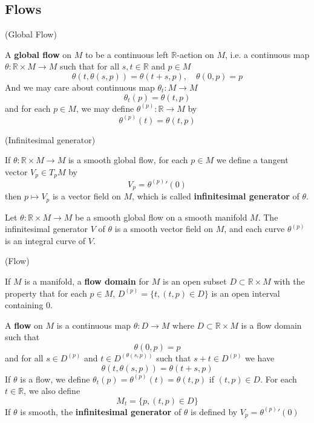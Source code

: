 \subsection{Flows}

\begin{definition}(Global Flow)\par
    A \textbf{global flow} on $M$ to be a continuous left $\mathbb{R}$-action on $M$, i.e. a continuous map $\theta:\mathbb{R}\times M \to M$ such that for all $s,t\in\mathbb{R}$ and $p\in M$
    \[\theta(t,\theta(s,p)) = \theta(t+s,p),\quad \theta(0,p) = p\]
    And we may care about continuous map $\theta_t:M\to M$
    \[\theta_t(p) = \theta(t,p)\]
    and for each $p\in M$, we may define $\theta^{(p)}:\mathbb{R} \to M$
    by 
    \[\theta^{(p)}(t) = \theta(t,p)\]
\end{definition}


\begin{definition}(Infinitesimal generator)\par
    If $\theta:\mathbb{R}\times M \to M$ is a smooth global flow, for each $p\in M$ we define a tangent vector $V_p\in T_pM$ by
    \[V_p = {\theta^{(p)}}'(0)\]
    then $p\mapsto V_p$ is a vector field on $M$, which is called \textbf{infinitesimal generator} of $\theta$.     
\end{definition}

\begin{proposition}
    Let $\theta:\mathbb{R} \times M \to M$ be a smooth global flow on a smooth manifold $M$. The infinitesimal generator $V$ of $\theta$ is a smooth vector field on $M$, and each curve $\theta^{(p)}$ is an integral curve of $V$.
\end{proposition}

\begin{definition}(Flow)\par
    If $M$ is a manifold, a \textbf{flow domain} for $M$ is an open subset $D\subset \mathbb{R} \times M$ with the property that for each $p\in M$, $D^{(p)} = \{t, (t,p)\in D\}$ is an open interval containing $0$.\par
    A \textbf{flow} on $M$ is a continuous map $\theta:D\to M$ where $D\subset \mathbb{R}\times M$ is a flow domain such that
    \[\theta(0,p) = p\]
    and for all $s\in D^{(p)}$ and $t\in D^{(\theta(s,p))}$ such that $s+t\in D^{(p)}$
    we have
    \[\theta(t,\theta(s,p)) = \theta(t+s,p)\]
    If $\theta$ is a flow, we define $\theta_t(p) = \theta^{(p)}(t) = \theta(t,p)$ if $(t,p)\in D$. For each $t\in \mathbb{R}$, we also define
    \[M_t = \{p,(t,p)\in D\}\]
    If $\theta$ is smooth, the \textbf{infinitesimal generator} of $\theta$ is defined by $V_p = {\theta^{(p)}}'(0)$
\end{definition}

